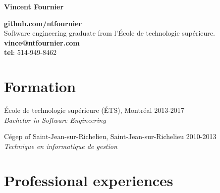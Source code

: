 \documentclass{res}
\newcommand{\inFrench}[1]{}
\newcommand{\inEnglish}[1]{#1}
\begin{document}
\thispagestyle{empty} %

{\bf\huge Vincent Fournier}
\inFrench{
	\hfill \textbf {github.com/ntfournier} \\
	Diplômé en génie logiciel de l’École de technologie supérieure.
	\hfill \textbf {vince@ntfournier.com} \\
	\hfill \textbf {Tél.}: 514-949-8462 \\
}
\inEnglish{
	\hfill \textbf {github.com/ntfournier} \\
	Software engineering graduate from l'École de technologie supérieure.
	\hfill \textbf {vince@ntfournier.com} \\
	\hfill \textbf {tel}: 514-949-8462 \\
}
\vspace{-15pt}

\begin{resume}
\section{Formation}
\vspace{4pt}

\inFrench{
	École de technologie supérieure (ÉTS), Montréal
	\hfill 2013-2017 \\
	{\sl Baccalauréat en génie logiciel}

	Cégep de Saint-Jean-sur-Richelieu, Saint-Jean-sur-Richelieu
	\hfill 2010-2013 \\
	{\sl Technique en informatique de gestion}
}
\inEnglish{
	École de technologie supérieure (ÉTS), Montréal
	\hfill 2013-2017 \\
	{\sl Bachelor in Software Engineering}

	Cégep of Saint-Jean-sur-Richelieu, Saint-Jean-sur-Richelieu
	\hfill 2010-2013 \\
	{\sl Technique en informatique de gestion}
}


\inFrench{
	\section{Expériences professionnelles}
}
\inEnglish{
	\section{Professional experiences}
}
\vspace{6pt}

\inFrench{
	Ericsson, Montréal\footnotemark
	\hfill mai à septembre 2016 \\
	{\sl Développeur Java} \hfill (Stage universitaire 3)
	\vspace{0.05in}

}
\end{resume}
\end{document}
